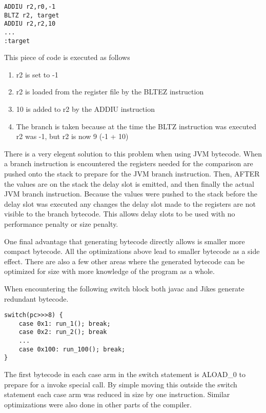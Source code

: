 \documentclass{acmconf}
\begin{document}
{\footnotesize\begin{verbatim}
ADDIU r2,r0,-1
BLTZ r2, target
ADDIU r2,r2,10
...
:target
\end{verbatim}}

This piece of code is executed as follows

\begin{enumerate}

\item r2 is set to -1

\item r2 is loaded from the register file by the BLTEZ instruction
      
\item 10 is added to r2 by the ADDIU instruction

\item The branch is taken because at the time the BLTZ instruction was
      executed r2 was -1, but r2 is now 9 (-1 + 10)

\end{enumerate}

There is a very elegent solution to this problem when using JVM
bytecode. When a branch instruction is encountered the registers
needed for the comparison are pushed onto the stack to prepare for the
JVM branch instruction. Then, AFTER the values are on the stack the
delay slot is emitted, and then finally the actual JVM branch
instruction. Because the values were pushed to the stack before the
delay slot was executed any changes the delay slot made to the
registers are not visible to the branch bytecode. This allows delay
slots to be used with no performance penalty or size penalty.

One final advantage that generating bytecode directly allows is
smaller more compact bytecode. All the optimizations above lead to
smaller bytecode as a side effect. There are also a few other areas
where the generated bytecode can be optimized for size with more
knowledge of the program as a whole.

When encountering the following switch block both javac and Jikes
generate redundant bytecode.

{\footnotesize\begin{verbatim}
switch(pc>>>8) {
    case 0x1: run_1(); break;
    case 0x2: run_2(); break
    ...
    case 0x100: run_100(); break;
}
\end{verbatim}}

The first bytecode in each case arm in the switch statement is ALOAD\_0 to
prepare for a invoke special call. By simple moving this outside the switch
statement each case arm was reduced in size by one instruction. Similar
optimizations were also done in other parts of the compiler.
\end{document}
